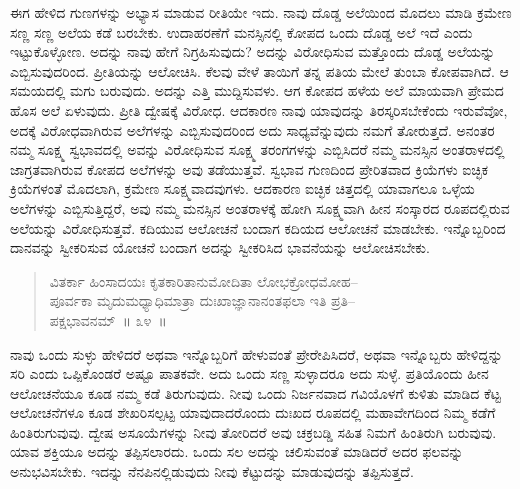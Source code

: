 ಈಗ ಹೇಳಿದ ಗುಣಗಳನ್ನು ಅಭ್ಯಾಸ ಮಾಡುವ ರೀತಿಯೇ ಇದು. ನಾವು ದೊಡ್ಡ ಅಲೆಯಿಂದ ಮೊದಲು ಮಾಡಿ ಕ್ರಮೇಣ ಸಣ್ಣ ಸಣ್ಣ ಅಲೆಯ ಕಡೆ ಬರಬೇಕು. ಉದಾಹರಣೆಗೆ ಮನಸ್ಸಿನಲ್ಲಿ ಕೋಪದ ಒಂದು ದೊಡ್ಡ ಅಲೆ ಇದೆ ಎಂದು ಇಟ್ಟುಕೊಳ್ಳೋಣ. ಅದನ್ನು ನಾವು ಹೇಗೆ ನಿಗ್ರಹಿಸುವುದು? ಅದನ್ನು ವಿರೋಧಿಸುವ ಮತ್ತೊಂದು ದೊಡ್ಡ ಅಲೆಯನ್ನು ಎಬ್ಬಿಸುವುದರಿಂದ. ಪ್ರೀತಿಯನ್ನು ಆಲೋಚಿಸಿ. ಕೆಲವು ವೇಳೆ ತಾಯಿಗೆ ತನ್ನ ಪತಿಯ ಮೇಲೆ ತುಂಬಾ ಕೋಪವಾಗಿದೆ. ಆ ಸಮಯದಲ್ಲಿ ಮಗು ಬರುವುದು. ಅದನ್ನು ಎತ್ತಿ ಮುದ್ದಿಸುವಳು. ಆಗ ಕೋಪದ ಹಳೆಯ ಅಲೆ ಮಾಯವಾಗಿ ಪ್ರೇಮದ ಹೊಸ ಅಲೆ ಏಳುವುದು. ಪ್ರೀತಿ ದ್ವೇಷಕ್ಕೆ ವಿರೋಧ. ಆದಕಾರಣ ನಾವು ಯಾವುದನ್ನು ತಿರಸ್ಕರಿಸಬೇಕೆಂದು ಇರುವೆವೋ, ಅದಕ್ಕೆ ವಿರೋಧವಾಗಿರುವ ಅಲೆಗಳನ್ನು ಎಬ್ಬಿಸುವುದರಿಂದ ಅದು ಸಾಧ್ಯವೆನ್ನುವುದು ನಮಗೆ ತೋರುತ್ತದೆ. ಅನಂತರ ನಮ್ಮ ಸೂಕ್ಷ್ಮ ಸ್ವಭಾವದಲ್ಲಿ ಅವನ್ನು ವಿರೋಧಿಸುವ ಸೂಕ್ಷ್ಮ ತರಂಗಗಳನ್ನು ಎಬ್ಬಿಸಿದರೆ ನಮ್ಮ ಮನಸ್ಸಿನ ಅಂತರಾಳದಲ್ಲಿ ಜಾಗ್ರತವಾಗಿರುವ ಕೋಪದ ಅಲೆಗಳನ್ನು ಅವು ತಡೆಯುತ್ತವೆ. ಸ್ವಭಾವ ಗುಣದಿಂದ ಪ್ರೇರಿತವಾದ ಕ್ರಿಯೆಗಳು ಐಚ್ಛಿಕ ಕ್ರಿಯೆಗಳಂತೆ ಮೊದಲಾಗಿ, ಕ್ರಮೇಣ ಸೂಕ್ಷ್ಮವಾದವುಗಳು. ಆದಕಾರಣ ಐಚ್ಛಿಕ ಚಿತ್ತದಲ್ಲಿ ಯಾವಾಗಲೂ ಒಳ್ಳೆಯ ಅಲೆಗಳನ್ನು ಎಬ್ಬಿಸುತ್ತಿದ್ದರೆ, ಅವು ನಮ್ಮ ಮನಸ್ಸಿನ ಅಂತರಾಳಕ್ಕೆ ಹೋಗಿ ಸೂಕ್ಷ್ಮವಾಗಿ ಹೀನ ಸಂಸ್ಕಾರದ ರೂಪದಲ್ಲಿರುವ ಅಲೆಯನ್ನು ವಿರೋಧಿಸುತ್ತವೆ. ಕದಿಯುವ ಆಲೋಚನೆ ಬಂದಾಗ ಕದಿಯದ ಆಲೋಚನೆ ಮಾಡಬೇಕು. ಇನ್ನೊಬ್ಬರಿಂದ ದಾನವನ್ನು ಸ್ವೀಕರಿಸುವ ಯೋಚನೆ ಬಂದಾಗ ಅದನ್ನು ಸ್ವೀಕರಿಸಿದ ಭಾವನೆಯನ್ನು ಆಲೋಚಿಸಬೇಕು. 

\vspace{-0.4cm}

\begin{verse}
ವಿತರ್ಕಾ ಹಿಂಸಾದಯಃ ಕೃತಕಾರಿತಾನುಮೋದಿತಾ ಲೋಭಕ್ರೋಧಮೋಹ–\\ಪೂರ್ವಕಾ ಮೃದುಮಧ್ಯಾಧಿಮಾತ್ರಾ ದುಃಖಾಜ್ಞಾನಾನಂತಫಲಾ ಇತಿ ಪ್ರತಿ–\\ಪಕ್ಷಭಾವನಮ್​~॥ ೩೪~॥
\end{verse}

\vspace{-0.5cm}


\vspace{0.1cm}

ನಾವು ಒಂದು ಸುಳ್ಳು ಹೇಳಿದರೆ ಅಥವಾ ಇನ್ನೊಬ್ಬರಿಗೆ ಹೇಳುವಂತೆ ಪ್ರೇರೇಪಿಸಿದರೆ, ಅಥವಾ ಇನ್ನೊಬ್ಬರು ಹೇಳಿದ್ದನ್ನು ಸರಿ ಎಂದು ಒಪ್ಪಿಕೊಂಡರೆ ಅಷ್ಟೂ ಪಾತಕವೇ. ಅದು ಒಂದು ಸಣ್ಣ ಸುಳ್ಳಾದರೂ ಅದು ಸುಳ್ಳೆ. ಪ್ರತಿಯೊಂದು ಹೀನ ಆಲೋಚನೆಯೂ ಕೂಡ ನಮ್ಮ ಕಡೆ ತಿರುಗುವುದು. ನೀವು ಒಂದು ನಿರ್ಜನವಾದ ಗವಿಯೊಳಗೆ ಕುಳಿತು ಮಾಡಿದ ಕೆಟ್ಟ ಆಲೋಚನೆಗಳೂ ಕೂಡ ಶೇಖರಿಸಲ್ಪಟ್ಟ ಯಾವುದಾದರೊಂದು ದುಃಖದ ರೂಪದಲ್ಲಿ ಮಹಾವೇಗದಿಂದ ನಿಮ್ಮ ಕಡೆಗೆ ಹಿಂತಿರುಗುವುವು. ದ್ವೇಷ ಅಸೂಯೆಗಳನ್ನು ನೀವು ತೋರಿದರೆ ಅವು ಚಕ್ರಬಡ್ಡಿ ಸಹಿತ ನಿಮಗೆ ಹಿಂತಿರುಗಿ ಬರುವುವು. ಯಾವ ಶಕ್ತಿಯೂ ಅದನ್ನು ತಪ್ಪಿಸಲಾರದು. ಒಂದು ಸಲ ಅದನ್ನು ಚಲಿಸುವಂತೆ ಮಾಡಿದರೆ ಅದರ ಫಲವನ್ನು ಅನುಭವಿಸಬೇಕು. ಇದನ್ನು ನೆನಪಿನಲ್ಲಿಡುವುದು ನೀವು ಕೆಟ್ಟುದನ್ನು ಮಾಡುವುದನ್ನು ತಪ್ಪಿಸುತ್ತದೆ. 

